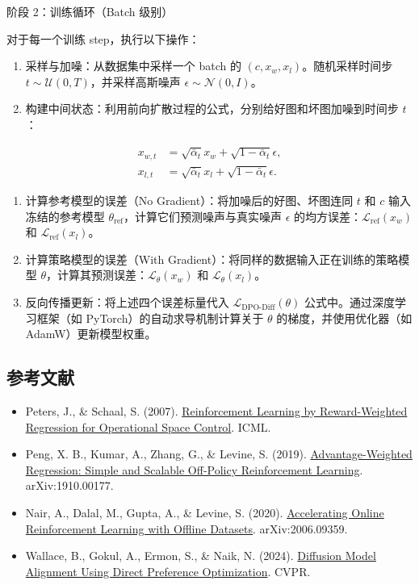 阶段 2：训练循环（Batch 级别）

对于每一个训练 step，执行以下操作：

\begin{enumerate}
\def\labelenumi{\arabic{enumi}.}
\tightlist
\item
  采样与加噪：从数据集中采样一个 batch 的 \((c,x_w,x_l)\)。随机采样时间步 \(t\sim\mathcal{U}(0,T)\)，并采样高斯噪声 \(\epsilon\sim\mathcal{N}(0,I)\)。
\item
  构建中间状态：利用前向扩散过程的公式，分别给好图和坏图加噪到时间步 \(t\)：
\end{enumerate}

\[
\begin{aligned}
x_{w,t} &= \sqrt{\bar{\alpha}_t}x_w+\sqrt{1-\bar{\alpha}_t}\epsilon,\\
x_{l,t} &= \sqrt{\bar{\alpha}_t}x_l+\sqrt{1-\bar{\alpha}_t}\epsilon.
\end{aligned}
\]

\begin{enumerate}
\def\labelenumi{\arabic{enumi}.}
\setcounter{enumi}{2}
\tightlist
\item
  计算参考模型的误差（No Gradient）：将加噪后的好图、坏图连同 \(t\) 和 \(c\) 输入冻结的参考模型 \(\theta_{\mathrm{ref}}\)，计算它们预测噪声与真实噪声 \(\epsilon\) 的均方误差：\(\mathcal{L}_{\mathrm{ref}}(x_w)\) 和 \(\mathcal{L}_{\mathrm{ref}}(x_l)\)。
\item
  计算策略模型的误差（With Gradient）：将同样的数据输入正在训练的策略模型 \(\theta\)，计算其预测误差：\(\mathcal{L}_\theta(x_w)\) 和 \(\mathcal{L}_\theta(x_l)\)。
\item
  反向传播更新：将上述四个误差标量代入 \(\mathcal{L}_{\mathrm{DPO}\text{-}\mathrm{Diff}}(\theta)\) 公式中。通过深度学习框架（如 PyTorch）的自动求导机制计算关于 \(\theta\) 的梯度，并使用优化器（如 AdamW）更新模型权重。
\end{enumerate}

\hypertarget{ux53c2ux8003ux6587ux732e-165}{%
\subsection{参考文献}\label{ux53c2ux8003ux6587ux732e-165}}

\begin{itemize}
\tightlist
\item
  Peters, J., \& Schaal, S. (2007). \href{https://dl.acm.org/doi/10.1145/1273496.1273590}{Reinforcement Learning by Reward-Weighted Regression for Operational Space Control}. ICML.
\item
  Peng, X. B., Kumar, A., Zhang, G., \& Levine, S. (2019). \href{https://arxiv.org/abs/1910.00177}{Advantage-Weighted Regression: Simple and Scalable Off-Policy Reinforcement Learning}. arXiv:1910.00177.
\item
  Nair, A., Dalal, M., Gupta, A., \& Levine, S. (2020). \href{https://arxiv.org/abs/2006.09359}{Accelerating Online Reinforcement Learning with Offline Datasets}. arXiv:2006.09359.
\item
  Wallace, B., Gokul, A., Ermon, S., \& Naik, N. (2024). \href{https://arxiv.org/abs/2311.12908}{Diffusion Model Alignment Using Direct Preference Optimization}. CVPR.
\end{itemize}


